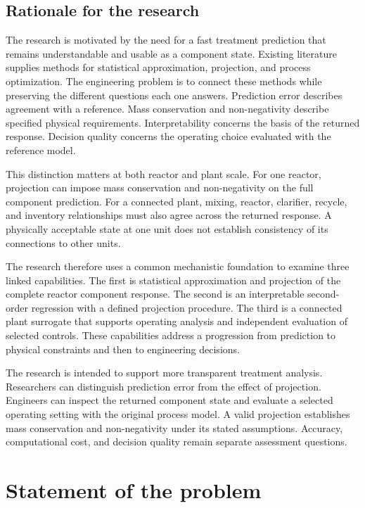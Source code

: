 \subsection{Rationale for the research}

The research is motivated by the need for a fast treatment prediction that remains understandable and usable as a component state. Existing literature supplies methods for statistical approximation, projection, and process optimization. The engineering problem is to connect these methods while preserving the different questions each one answers. Prediction error describes agreement with a reference. Mass conservation and non-negativity describe specified physical requirements. Interpretability concerns the basis of the returned response. Decision quality concerns the operating choice evaluated with the reference model.

This distinction matters at both reactor and plant scale. For one reactor, projection can impose mass conservation and non-negativity on the full component prediction. For a connected plant, mixing, reactor, clarifier, recycle, and inventory relationships must also agree across the returned response. A physically acceptable state at one unit does not establish consistency of its connections to other units.

The research therefore uses a common mechanistic foundation to examine three linked capabilities. The first is statistical approximation and projection of the complete reactor component response. The second is an interpretable second-order regression with a defined projection procedure. The third is a connected plant surrogate that supports operating analysis and independent evaluation of selected controls. These capabilities address a progression from prediction to physical constraints and then to engineering decisions.

The research is intended to support more transparent treatment analysis. Researchers can distinguish prediction error from the effect of projection. Engineers can inspect the returned component state and evaluate a selected operating setting with the original process model. A valid projection establishes mass conservation and non-negativity under its stated assumptions. Accuracy, computational cost, and decision quality remain separate assessment questions.

\section{Statement of the problem}

